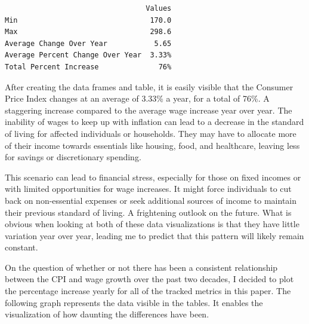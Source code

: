 \documentclass[
  letterpaper,
  DIV=11,
  numbers=noendperiod]{scrartcl}
\begin{document}
\begin{verbatim}
                                 Values
Min                               170.0
Max                               298.6
Average Change Over Year           5.65
Average Percent Change Over Year  3.33%
Total Percent Increase              76%
\end{verbatim}

After creating the data frames and table, it is easily visible that the
Consumer Price Index changes at an average of 3.33\% a year, for a total
of 76\%. A staggering increase compared to the average wage increase
year over year. The inability of wages to keep up with inflation can
lead to a decrease in the standard of living for affected individuals or
households. They may have to allocate more of their income towards
essentials like housing, food, and healthcare, leaving less for savings
or discretionary spending.

This scenario can lead to financial stress, especially for those on
fixed incomes or with limited opportunities for wage increases. It might
force individuals to cut back on non-essential expenses or seek
additional sources of income to maintain their previous standard of
living. A frightening outlook on the future. What is obvious when
looking at both of these data visualizations is that they have little
variation year over year, leading me to predict that this pattern will
likely remain constant.

On the question of whether or not there has been a consistent
relationship between the CPI and wage growth over the past two decades,
I decided to plot the percentage increase yearly for all of the tracked
metrics in this paper. The following graph represents the data visible
in the tables. It enables the visualization of how daunting the
differences have been.
\end{document}
